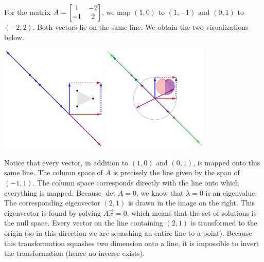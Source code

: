 \begin{example}
For the matrix 
$A=\begin{bmatrix} 1&-2\\-1&2 \end{bmatrix}$, we map $(1,0)$ to $(1,-1)$ and $(0,1)$ to $(-2,2)$. Both vectors lie on the same line.
We obtain the two visualizations below. 
\begin{center}
\includegraphics[height=2in]{04-Linear-Transformations/support/LTsingular2da}
\includegraphics[height=2in]{04-Linear-Transformations/support/LTsingular2db}
\end{center}
Notice that every vector, in addition to $(1,0)$ and $(0,1)$, is mapped onto this same line.  The column space of $A$ is precisely the line given by the span of $(-1,1)$. The column space corresponds directly with the line onto which everything is mapped. Because $\det A = 0$, we know that $\lambda=0$ is an eigenvalue. The corresponding eigenvector $(2,1)$ is drawn in the image on the right. This eigenvector is found by solving $A\vec x = 0$, which means that the set of solutions is the null space.  Every vector on the line containing $(2,1)$ is transformed to the origin (so in this direction we are squashing an entire line to a point).  Because this transformation squashes two dimension onto a line, it is impossible to invert the transformation (hence no inverse exists).

\end{example}
